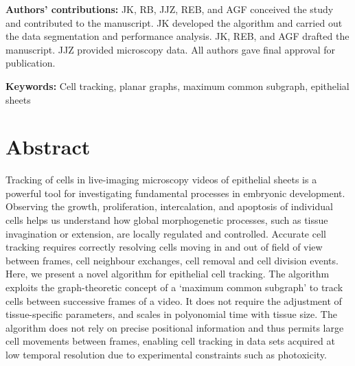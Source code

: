 \documentclass[a4paper,11pt]{article}
\newcommand{\todo}[1]{{\color{red} \bf TODO: #1}}
\begin{document}

\noindent \textbf{Authors' contributions:} 
JK, RB, JJZ, REB, and AGF conceived the study and contributed to the manuscript. JK developed the algorithm and carried out the data segmentation and performance analysis. JK, REB, and AGF drafted the manuscript. JJZ provided microscopy data. All authors gave final approval for publication. 
\vspace{1.0em}

\noindent \textbf{Keywords:} Cell tracking, planar graphs, maximum common subgraph, epithelial sheets



\clearpage

\section*{Abstract}
Tracking of cells in live-imaging microscopy videos of epithelial sheets is a powerful tool for investigating fundamental processes in embryonic development. 
Observing the growth, proliferation, intercalation, and apoptosis of individual cells helps us understand how global morphogenetic processes, such as tissue invagination or extension, are locally regulated and controlled. 
Accurate cell tracking requires correctly resolving cells moving in and out of field of view between frames, cell neighbour exchanges, cell removal and cell division events. 
Here, we present a novel algorithm for epithelial cell tracking. 
The algorithm exploits the graph-theoretic concept of a `maximum common subgraph' to track cells between successive frames of a video. 
It does not require the adjustment of tissue-specific parameters, and scales in polyonomial time with tissue size. 
The algorithm does not rely on precise positional information and thus permits large cell movements between frames, enabling cell tracking in data sets acquired at low temporal resolution due to experimental constraints such as photoxicity. 
\end{document}
